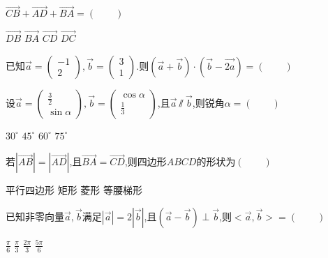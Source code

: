 \documentclass{exercise_wvqusrai}
\begin{document}
\begin{questions}
\question[4]
$\overrightarrow{CB}+\overrightarrow{AD}+\overrightarrow{BA}=(\qquad)$

\begin{oneparchoices}
\choice $\overrightarrow{DB}$
\choice $\overrightarrow{BA}$
\choice $\overrightarrow{CD}$
\choice $\overrightarrow{DC}$
\end{oneparchoices}

\question[4]
已知$\vec{a}=\begin{pmatrix}
-1\\2
\end{pmatrix},\vec{b}=\begin{pmatrix}
3\\1
\end{pmatrix}$.则$\left(\vec{a}+\vec{b}\right)\cdot\left(\vec{b}-\vec{2a}\right)=(\qquad)$

\begin{oneparchoices}
\end{oneparchoices}


\question[4]
设$\vec{a}=\begin{pmatrix}
\frac{3}{2}\\
\sin\alpha
\end{pmatrix},\vec{b}=\begin{pmatrix}
\cos\alpha\\
\frac{1}{3}
\end{pmatrix}$,且$\vec{a}\sslash\vec{b}$,则锐角$\alpha=(\qquad)$

\begin{oneparchoices}
\choice $30^\circ$
\choice $45^\circ$
\choice $60^\circ$
\choice $75^\circ$
\end{oneparchoices}

\question[4]
若$\left|\overrightarrow{AB}\right|=\left|\overrightarrow{AD}\right|$,且$\overrightarrow{BA}=\overrightarrow{CD}$,则四边形$ABCD$的形状为$(\qquad)$

\begin{oneparchoices}
\choice 平行四边形
\choice 矩形
\choice 菱形
\choice 等腰梯形
\end{oneparchoices}

\question[4]
已知非零向量$\vec{a},\vec{b}$满足$\left|\vec{a}\right|=2\left|\vec{b}\right|$,且$\left(\vec{a}-\vec{b}\right)\perp\vec{b}$,则$<\vec{a},\vec{b}>=(\qquad)$

\begin{oneparchoices}
\choice $\frac{\pi}{6}$
\choice $\frac{\pi}{3}$
\choice $\frac{2\pi}{3}$
\choice $\frac{5\pi}{6}$
\end{oneparchoices}


\end{questions}
\end{document}
